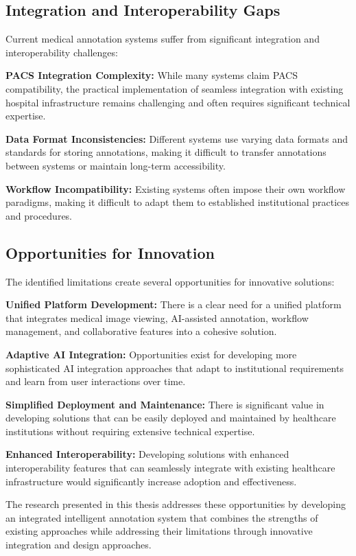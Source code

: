 \subsection{Integration and Interoperability Gaps}

Current medical annotation systems suffer from significant integration and interoperability challenges:

\textbf{PACS Integration Complexity:} While many systems claim PACS compatibility, the practical implementation of seamless integration with existing hospital infrastructure remains challenging and often requires significant technical expertise.

\textbf{Data Format Inconsistencies:} Different systems use varying data formats and standards for storing annotations, making it difficult to transfer annotations between systems or maintain long-term accessibility.

\textbf{Workflow Incompatibility:} Existing systems often impose their own workflow paradigms, making it difficult to adapt them to established institutional practices and procedures.

\subsection{Opportunities for Innovation}

The identified limitations create several opportunities for innovative solutions:

\textbf{Unified Platform Development:} There is a clear need for a unified platform that integrates medical image viewing, AI-assisted annotation, workflow management, and collaborative features into a cohesive solution.

\textbf{Adaptive AI Integration:} Opportunities exist for developing more sophisticated AI integration approaches that adapt to institutional requirements and learn from user interactions over time.

\textbf{Simplified Deployment and Maintenance:} There is significant value in developing solutions that can be easily deployed and maintained by healthcare institutions without requiring extensive technical expertise.

\textbf{Enhanced Interoperability:} Developing solutions with enhanced interoperability features that can seamlessly integrate with existing healthcare infrastructure would significantly increase adoption and effectiveness.

The research presented in this thesis addresses these opportunities by developing an integrated intelligent annotation system that combines the strengths of existing approaches while addressing their limitations through innovative integration and design approaches. 